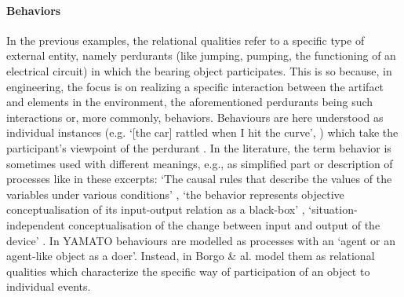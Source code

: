 \documentclass[sw]{iosart2x}
\newcommand{\YAMATO}{\textsc{YAMATO}\xspace}
\newcommand{\quotes}[1]{`#1'}
\newcommand{\TODO}[1]{{\color{red} #1}}
\begin{document}
\paragraph{Behaviors}
In the previous examples, the relational qualities refer to a specific type of external entity, namely perdurants (like jumping, pumping, the functioning of an electrical circuit) in which the bearing object participates. 
This is so because, in engineering, the focus is on realizing a specific interaction between the artifact and elements in the environment, the aforementioned perdurants being such interactions or, more commonly, behaviors. 
Behaviours are here understood as individual instances (e.g. \quotes{[the car] rattled when I hit the curve}, \cite{chandrasekaranFunctionDeviceRepresentation2000})
which take the participant's viewpoint of the perdurant \cite{borgoFormalOntologicalPerspective2009}.
In the literature, the term behavior is sometimes used with different meanings, e.g., as simplified part or description of processes like in these excerpts: \quotes{The causal rules that describe the values of the variables under various conditions} \cite{chandrasekaranFunctionDeviceRepresentation2000}, \quotes{the behavior represents objective conceptualisation of its input-output relation as a black-box} \cite{kitamuraOntologicalModelDevice2006}, \quotes{situation-independent conceptualisation of the change between input and output of the device} \cite{mizoguchiFunctionalOntologyArtifacts2009}. 
In \YAMATO \cite{Mizoguchi2017YAMATOYA} behaviours are modelled as processes with an \quotes{agent or an agent-like object as a doer}. 
Instead, in \cite{borgoFormalOntologicalPerspective2009} Borgo \& al.  model them as relational qualities which characterize the specific way of participation of an object to individual events. 
\end{document}
